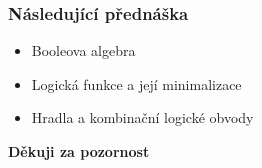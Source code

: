   \begin{frame}
    \frametitle{Následující přednáška}
		
		
		\begin{itemize}
			\item Booleova algebra
			\item Logická funkce a její minimalizace
			\item Hradla a kombinační logické obvody
		\end{itemize}
		
		\begin{center}
			\textbf{Děkuji za pozornost}
		\end{center}
		
	\end{frame}